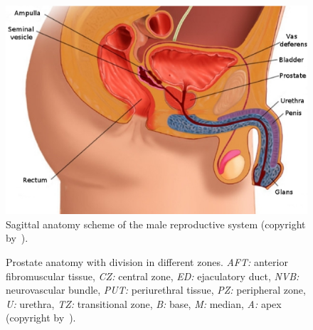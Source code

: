 \begin{figure}
  \centering
  \includegraphics[height=0.25\textheight]{1_introduction/figures/anatomy/prostate2D.eps}
  \caption[Sagittal anatomy of prostate.]{Sagittal anatomy scheme of the male
    reproductive system (copyright by~\cite{Geckomedia2011}).}
  \label{fig:prostatelocation}
\end{figure}

\begin{figure}
  \centering
  \hspace*{\fill}
  \hfill
  \hspace*{\fill}
  \caption[Prostate anatomy.]{Prostate anatomy with division in different
    zones. \textit{AFT:} anterior fibromuscular tissue, \textit{CZ:} central
    zone, \textit{ED:} ejaculatory duct, \textit{NVB:} neurovascular bundle,
    \textit{PUT:} periurethral tissue, \textit{PZ:} peripheral zone,
    \textit{U:} urethra, \textit{TZ:} transitional zone, \textit{B:} base,
    \textit{M:} median, \textit{A:} apex (copyright by~\cite{Choi2007}).}
  \label{fig:anatomyProstateZone}
\end{figure}


